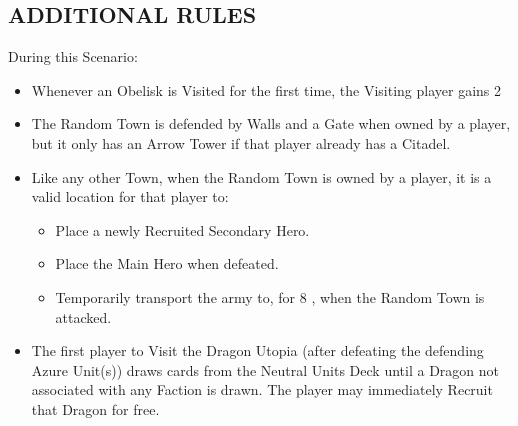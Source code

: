 \begin{multicols}{2}
\subsection*{\MakeUppercase{Additional Rules}}
During this Scenario:
\begin{itemize}
  \item Whenever an Obelisk is Visited for the first time, the Visiting player gains 2 
  \item The Random Town is defended by Walls and a Gate when owned by a player, but it only has an Arrow Tower if that player already has a Citadel.
  \item Like any other Town, when the Random Town is owned by a player, it is a valid location for that player to:
    \begin{itemize}
      \item Place a newly Recruited Secondary Hero.
      \item Place the Main Hero when defeated.
      \item Temporarily transport the army to, for 8 , when the Random Town is attacked.
    \end{itemize}
  \item The first player to Visit the Dragon Utopia (after defeating the defending Azure Unit(s)) draws cards from the Neutral Units  Deck until a Dragon not associated with any Faction is drawn.
    The player may immediately Recruit that Dragon for free.
\end{itemize}

\columnbreak

\phantom{.}
\vfill
\begin{center}
\end{center}
\vfill
\phantom{.}
\end{multicols}


